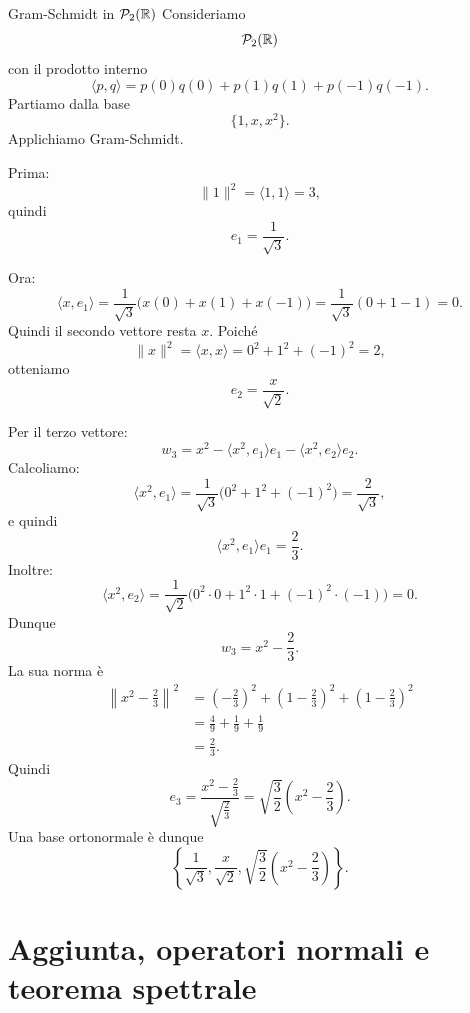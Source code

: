 \documentclass[a4paper]{article}
\begin{document}
\begin{snippetexample}{Gram-Schmidt in \(\mathcal{P}_2(\mathbb{R})\)}
    Consideriamo
    \[
        \mathcal{P}_2(\mathbb{R})
    \]
    con il prodotto interno
    \[
        \langle p,q\rangle
        =
        p(0)q(0)+p(1)q(1)+p(-1)q(-1).
    \]
    Partiamo dalla base
    \[
        \{1,x,x^2\}.
    \]
    Applichiamo Gram-Schmidt.

    Prima:
    \[
        \|1\|^2=\langle 1,1\rangle=3,
    \]
    quindi
    \[
        e_1=\frac{1}{\sqrt{3}}.
    \]

    Ora:
    \[
        \langle x,e_1\rangle
        =
        \frac{1}{\sqrt{3}}\bigl(x(0)+x(1)+x(-1)\bigr)
        =
        \frac{1}{\sqrt{3}}(0+1-1)=0.
    \]
    Quindi il secondo vettore resta \(x\). Poiché
    \[
        \|x\|^2
        =
        \langle x,x\rangle
        =
        0^2+1^2+(-1)^2=2,
    \]
    otteniamo
    \[
        e_2=\frac{x}{\sqrt{2}}.
    \]

    Per il terzo vettore:
    \[
        w_3
        =
        x^2-\langle x^2,e_1\rangle e_1-\langle x^2,e_2\rangle e_2.
    \]
    Calcoliamo:
    \[
        \langle x^2,e_1\rangle
        =
        \frac{1}{\sqrt{3}}\bigl(0^2+1^2+(-1)^2\bigr)
        =
        \frac{2}{\sqrt{3}},
    \]
    e quindi
    \[
        \langle x^2,e_1\rangle e_1
        =
        \frac{2}{3}.
    \]
    Inoltre:
    \[
        \langle x^2,e_2\rangle
        =
        \frac{1}{\sqrt{2}}\bigl(0^2\cdot 0+1^2\cdot 1+(-1)^2\cdot(-1)\bigr)
        =
        0.
    \]
    Dunque
    \[
        w_3=x^2-\frac{2}{3}.
    \]
    La sua norma è
    \begin{align*}
        \left\|x^2-\frac{2}{3}\right\|^2
        &=
        \left(-\frac{2}{3}\right)^2
        +
        \left(1-\frac{2}{3}\right)^2
        +
        \left(1-\frac{2}{3}\right)^2\\
        &=
        \frac{4}{9}+\frac{1}{9}+\frac{1}{9}\\
        &=
        \frac{2}{3}.
    \end{align*}
    Quindi
    \[
        e_3
        =
        \frac{x^2-\frac{2}{3}}{\sqrt{\frac{2}{3}}}
        =
        \sqrt{\frac{3}{2}}\left(x^2-\frac{2}{3}\right).
    \]
    Una base ortonormale è dunque
    \[
        \left\{
            \frac{1}{\sqrt{3}},
            \frac{x}{\sqrt{2}},
            \sqrt{\frac{3}{2}}\left(x^2-\frac{2}{3}\right)
        \right\}.
    \]
\end{snippetexample}

\section{Aggiunta, operatori normali e teorema spettrale}
\end{document}

